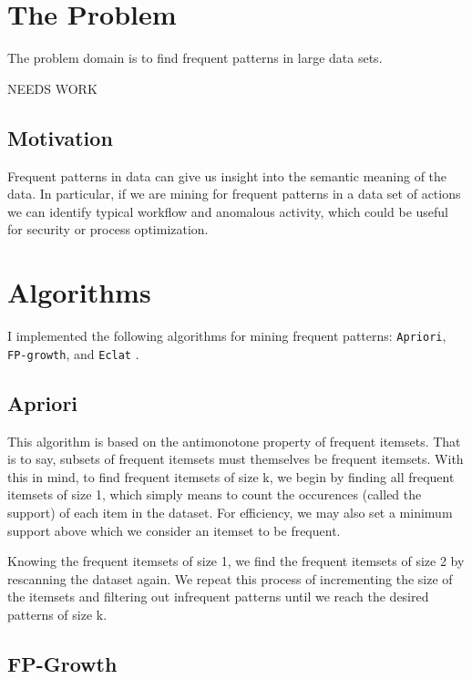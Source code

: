 \documentclass[11pt]{article}
\begin{document}
\begin{multicols}{2} %


\section{The Problem}

The problem domain is to find frequent patterns in large data sets.

NEEDS WORK

\subsection{Motivation}

Frequent patterns in data can give us insight into the semantic
meaning of the data.  In particular, if we are mining for frequent
patterns in a data set of actions we can identify typical workflow and
anomalous activity, which could be useful for security or process
optimization.

\section{Algorithms}

I implemented the following algorithms for mining frequent patterns:
\texttt{Apriori}, \texttt{FP-growth}, and \texttt{Eclat}
\cite{Han2007,fpmlecture}.

\subsection{Apriori}

This algorithm is based on the antimonotone property of frequent
itemsets.  That is to say, subsets of frequent itemsets must
themselves be frequent itemsets.  With this in mind, to find frequent
itemsets of size k, we begin by finding all frequent itemsets of size
1, which simply means to count the occurences (called the support) of
each item in the dataset.  For efficiency, we may also set a minimum
support above which we consider an itemset to be frequent.

Knowing the frequent itemsets of size 1, we find the frequent itemsets
of size 2 by rescanning the dataset again.  We repeat this process of
incrementing the size of the itemsets and filtering out infrequent
patterns until we reach the desired patterns of size k.

\subsection{FP-Growth}


\end{multicols}
\end{document}
